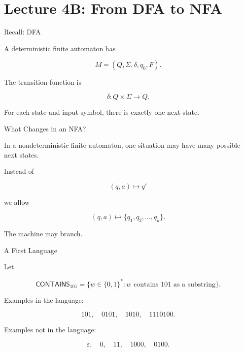\documentclass[10pt,aspectratio=169]{beamer}
\newcommand{\eps}{\varepsilon}
\newcommand{\lang}[1]{\mathsf{#1}}
\begin{document}
\section{Lecture 4B: From DFA to NFA}

\begin{frame}{Recall: DFA}

A deterministic finite automaton has

\[
M=(Q,\Sigma,\delta,q_0,F).
\]

\vspace{1em}

The transition function is

\[
\delta:Q\times\Sigma\rightarrow Q.
\]

\vspace{1em}

For each state and input symbol, there is exactly one next state.

\end{frame}

\begin{frame}{What Changes in an NFA?}

In a nondeterministic finite automaton, one situation may have many possible next states.

\vspace{1em}

Instead of

\[
(q,a)\longmapsto q'
\]

we allow

\[
(q,a)\longmapsto \{q_1,q_2,\ldots,q_k\}.
\]

\vspace{1em}

The machine may branch.

\end{frame}

\begin{frame}{A First Language}

Let

\[
\lang{CONTAINS}_{101}
=
\{w\in\{0,1\}^*: w \text{ contains }101\text{ as a substring}\}.
\]

\vspace{1em}

Examples in the language:

\[
101,\quad 0101,\quad 1010,\quad 1110100.
\]

Examples not in the language:

\[
\eps,\quad 0,\quad 11,\quad 1000,\quad 0100.
\]

\end{frame}
\end{document}
